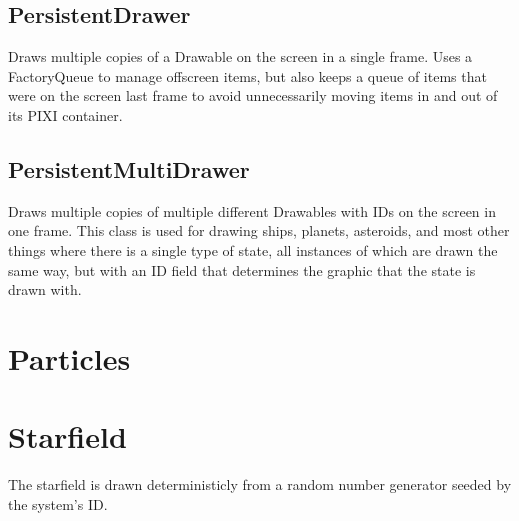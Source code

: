 \documentclass{article}
\begin{document}
\subsection{PersistentDrawer}
Draws multiple copies of a Drawable on the screen in a single frame. Uses a FactoryQueue to manage offscreen items, but also keeps a queue of items that were on the screen last frame to avoid unnecessarily moving items in and out of its PIXI container.

\subsection{PersistentMultiDrawer}
Draws multiple copies of multiple different Drawables with IDs on the screen in one frame. This class is used for drawing ships, planets, asteroids, and most other things where there is a single type of state, all instances of which are drawn the same way, but with an ID field that determines the graphic that the state is drawn with.


\section{Particles}


\section{Starfield}
The starfield is drawn deterministicly from a random number generator seeded by the system's ID. 
\end{document}
